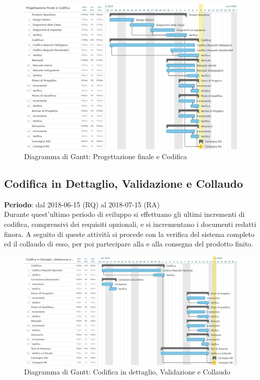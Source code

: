 \begin{figure}[h!]
	\centerline{\includegraphics[scale=0.5]{img/DiagrammiGantt/ProgettazioneFinaleCodifica.jpg}}
	\caption{Diagramma di Gantt: Progettazione finale e Codifica}
	\label{fig:gantt_prog_fin_cod}
\end{figure}
\clearpage

\subsection{Codifica in Dettaglio, Validazione e Collaudo}
\textbf{Periodo}: dal 2018-06-15 (RQ) al 2018-07-15 (RA)\\

Durante quest'ultimo periodo di sviluppo si effettuano gli ultimi incrementi di codifica, comprensivi dei requisiti opzionali, e si incrementano i documenti redatti finora. A seguito di queste attività si procede con la verifica del sistema completo ed il collaudo di esso, per poi partecipare alla \RA{} e alla consegna del prodotto finito.

\begin{figure}[h!]
	\centerline{\includegraphics[scale=0.45]{img/DiagrammiGantt/CodificaValidazioneCollaudo.jpg}}
	\caption{Diagramma di Gantt: Codifica in dettaglio, Validazione e Collaudo}
	\label{fig:gantt_cod_valid_coll}
\end{figure}
\clearpage
